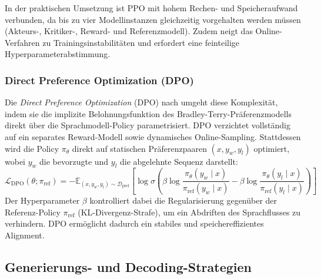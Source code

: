 In der praktischen Umsetzung ist PPO mit hohem Rechen- und Speicheraufwand verbunden, da bis zu vier Modellinstanzen gleichzeitig vorgehalten werden müssen (Akteurs-, Kritiker-, Reward- und Referenzmodell). Zudem neigt das Online-Verfahren zu Trainingsinstabilitäten und erfordert eine feinteilige Hyperparameterabstimmung.

\subsubsection{Direct Preference Optimization (DPO)}
\label{sec:dpo_theorie}
Die \textit{Direct Preference Optimization} (DPO) nach \citet{rafailov2023direct} umgeht diese Komplexität, indem sie die implizite Belohnungsfunktion des Bradley-Terry-Präferenzmodells direkt über die Sprachmodell-Policy parametrisiert. DPO verzichtet vollständig auf ein separates Reward-Modell sowie dynamisches Online-Sampling. Stattdessen wird die Policy $\pi_\theta$ direkt auf statischen Präferenzpaaren $(x, y_w, y_l)$ optimiert, wobei $y_w$ die bevorzugte und $y_l$ die abgelehnte Sequenz darstellt:
\begin{equation}
    \mathcal{L}_{\text{DPO}}(\theta; \pi_{\text{ref}}) = - \mathbb{E}_{(x, y_w, y_l) \sim \mathcal{D}_{\text{pref}}} \left[ \log \sigma \left( \beta \log \frac{\pi_\theta(y_w \mid x)}{\pi_{\text{ref}}(y_w \mid x)} - \beta \log \frac{\pi_\theta(y_l \mid x)}{\pi_{\text{ref}}(y_l \mid x)} \right) \right]
    \label{eq:dpo_loss}
\end{equation}
Der Hyperparameter $\beta$ kontrolliert dabei die Regularisierung gegenüber der Referenz-Policy $\pi_{\text{ref}}$ (KL-Divergenz-Strafe), um ein Abdriften des Sprachflusses zu verhindern. DPO ermöglicht dadurch ein stabiles und speichereffizientes Alignment.

\subsection{Generierungs- und Decoding-Strategien}
\label{sec:decoding_strategien_theorie}

